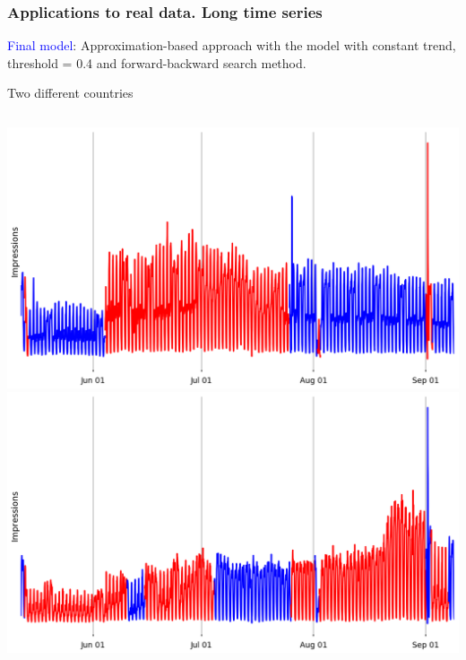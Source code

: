 \documentclass[intlimits, 9pt, unicode]{beamer}
\newcommand{\textblue}[1]{\textcolor{blue}{#1}}
\begin{document}
\begin{frame}
    \frametitle{Applications to real data. Long time series}
    
\textblue{Final model}: Approximation-based approach with the model with constant trend, threshold = 0.4 and forward-backward search method.

\bigskip
Two different countries
\medskip
  \begin{columns}[T,onlytextwidth]
	\includegraphics[scale=0.16]{images/long_ts_1}
	\includegraphics[scale=0.16]{images/long_ts_2}
     \end{columns}
\end{frame}




	
\end{document}
